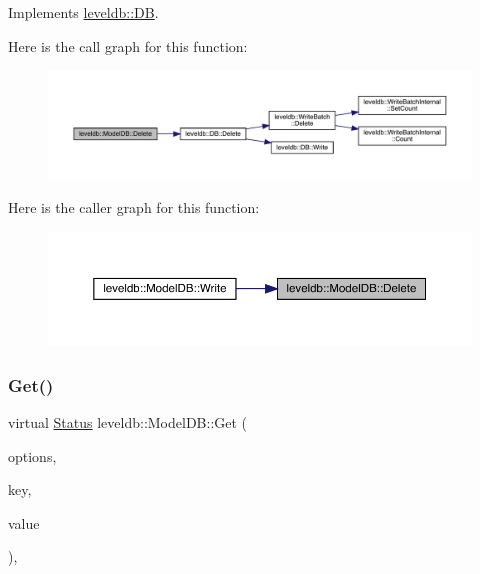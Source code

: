 Implements \mbox{\hyperlink{classleveldb_1_1_d_b_aff7577239799cd059464701c548090b9}{leveldb\+::\+DB}}.

Here is the call graph for this function\+:
\nopagebreak
\begin{figure}[H]
\begin{center}
\leavevmode
\includegraphics[width=350pt]{classleveldb_1_1_model_d_b_a2c2690e07a206fd2197f592dd4478ff6_cgraph}
\end{center}
\end{figure}
Here is the caller graph for this function\+:
\nopagebreak
\begin{figure}[H]
\begin{center}
\leavevmode
\includegraphics[width=350pt]{classleveldb_1_1_model_d_b_a2c2690e07a206fd2197f592dd4478ff6_icgraph}
\end{center}
\end{figure}
\mbox{\label{classleveldb_1_1_model_d_b_ab7744a74b5c0d2cd812dd87e83ca561b}} 
\subsubsection{\texorpdfstring{Get()}{Get()}}
{\footnotesize\ttfamily virtual \mbox{\hyperlink{classleveldb_1_1_status}{Status}} leveldb\+::\+Model\+D\+B\+::\+Get (\begin{DoxyParamCaption}\item[{const \mbox{\hyperlink{structleveldb_1_1_read_options}{Read\+Options}} \&}]{options,  }\item[{const \mbox{\hyperlink{classleveldb_1_1_slice}{Slice}} \&}]{key,  }\item[{std\+::string $\ast$}]{value }\end{DoxyParamCaption})\hspace{0.3cm}{\ttfamily [inline]}, {\ttfamily [virtual]}}



